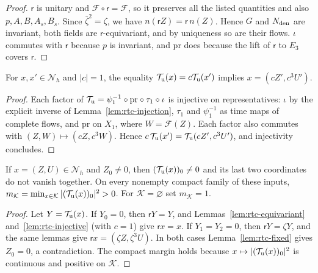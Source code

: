 \begin{proof}
$\mathsf r$ is unitary and $\mathcal F\circ\mathsf r=\mathcal F$, so it preserves all the listed quantities and also $p,A,B,A_s,B_s$. Since $\bar\zeta^2=\zeta$, we have $n(\mathsf rZ)=\mathsf r\,n(Z)$. Hence $G$ and $N_{\rm den}$ are invariant, both fields are $\mathsf r$-equivariant, and by uniqueness so are their flows. $\iota$ commutes with $\mathsf r$ because $p$ is invariant, and $\mathrm{pr}$ does because the lift of $\mathsf r$ to $E_3$ covers $\mathsf r$.
\end{proof}

\begin{lemma}\label{lem:rtc-injective}
For $x,x'\in\mathcal N_h$ and $|c|=1$, the equality
$\mathcal T_{\rm u}(x)=c\mathcal T_{\rm u}(x')$ implies
$x=(cZ',c^3U')$.
\end{lemma}

\begin{proof}
Each factor of $\mathcal T_{\rm u}=\psi_1^{-1}\circ\mathrm{pr}\circ\tau_1\circ\iota$ is injective on representatives: $\iota$ by the explicit inverse of Lemma~\ref{lem:rtc-injection}, $\tau_1$ and $\psi_1^{-1}$ as time maps of complete flows, and $\mathrm{pr}$ on $X_1$, where $W=\mathcal F(Z)$. Each factor also commutes with $(Z,W)\mapsto(cZ,c^3W)$. Hence $c\,\mathcal T_{\rm u}(x')=\mathcal T_{\rm u}(cZ',c^3U')$, and injectivity concludes.
\end{proof}

\begin{proposition}\label{prop:rtc-avoid}
If $x=(Z,U)\in\mathcal N_h$ and $Z_0\ne0$, then
$(\mathcal T_{\rm u}(x))_0\ne0$ and its last two coordinates do not vanish together.
On every nonempty compact family of these inputs,
$m_{\mathcal K}=\min_{x\in\mathcal K}|(\mathcal T_{\rm u}(x))_0|^2>0$. For $\mathcal K=\varnothing$ set $m_{\mathcal K}=1$.
\end{proposition}

\begin{proof}
Let $Y=\mathcal T_{\rm u}(x)$. If $Y_0=0$, then $\mathsf rY=Y$, and Lemmas~\ref{lem:rtc-equivariant} and~\ref{lem:rtc-injective} (with $c=1$) give $\mathsf rx=x$. If $Y_1=Y_2=0$, then $\mathsf rY=\zeta Y$, and the same lemmas give $\mathsf rx=(\zeta Z,\zeta^3U)$. In both cases Lemma~\ref{lem:rtc-fixed} gives $Z_0=0$, a contradiction. The compact margin holds because $x\mapsto|(\mathcal T_{\rm u}(x))_0|^2$ is continuous and positive on $\mathcal K$.
\end{proof}


